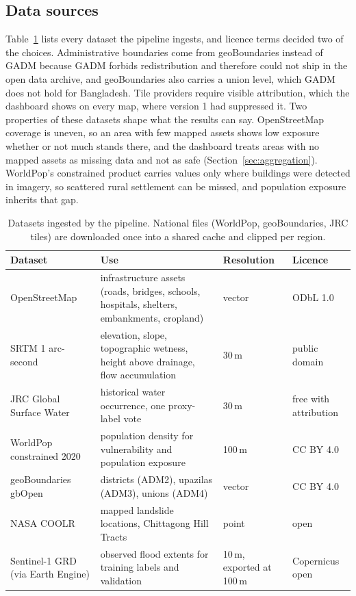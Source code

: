 \documentclass[10pt,a4paper,twocolumn]{article}
\begin{document}
\subsection{Data sources}

Table~\ref{tab:data} lists every dataset the pipeline ingests, and licence terms decided two of the choices. Administrative boundaries come from geoBoundaries instead of GADM because GADM forbids redistribution and therefore could not ship in the open data archive, and geoBoundaries also carries a union level, which GADM does not hold for Bangladesh. Tile providers require visible attribution, which the dashboard shows on every map, where version 1 had suppressed it. Two properties of these datasets shape what the results can say. OpenStreetMap coverage is uneven, so an area with few mapped assets shows low exposure whether or not much stands there, and the dashboard treats areas with no mapped assets as missing data and not as safe (Section~\ref{sec:aggregation}). WorldPop's constrained product carries values only where buildings were detected in imagery, so scattered rural settlement can be missed, and population exposure inherits that gap.

\begin{table}[t]
\centering
\small
\begin{tabularx}{\textwidth}{lXll}
\toprule
Dataset & Use & Resolution & Licence \\
\midrule
OpenStreetMap & infrastructure assets (roads, bridges, schools, hospitals, shelters, embankments, cropland) & vector & ODbL 1.0 \\
SRTM 1 arc-second & elevation, slope, topographic wetness, height above drainage, flow accumulation & 30\,m & public domain \\
JRC Global Surface Water & historical water occurrence, one proxy-label vote & 30\,m & free with attribution \\
WorldPop constrained 2020 & population density for vulnerability and population exposure & 100\,m & CC BY 4.0 \\
geoBoundaries gbOpen & districts (ADM2), upazilas (ADM3), unions (ADM4) & vector & CC BY 4.0 \\
NASA COOLR & mapped landslide locations, Chittagong Hill Tracts & point & open \\
Sentinel-1 GRD (via Earth Engine) & observed flood extents for training labels and validation & 10\,m, exported at 100\,m & Copernicus open \\
\bottomrule
\end{tabularx}
\caption{Datasets ingested by the pipeline. National files (WorldPop, geoBoundaries, JRC tiles) are downloaded once into a shared cache and clipped per region.}
\label{tab:data}
\end{table}
\end{document}
